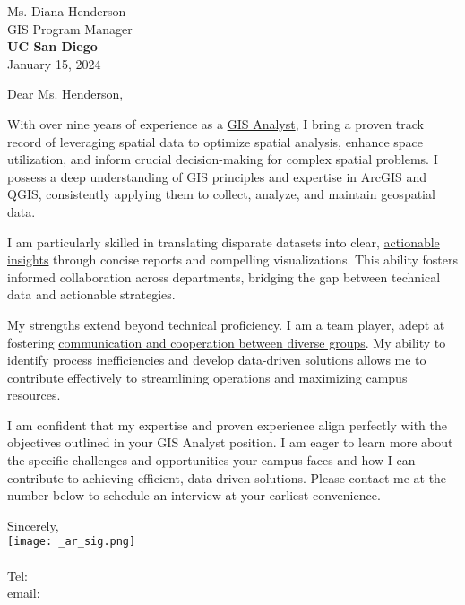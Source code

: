 \documentclass[letterpaper]{article}
\newcommand{\impt}[1]{\uline{#1}}
\newcommand{\CVcompany}{UC San Diego}
\begin{document}
\large
Ms. Diana Henderson \\
GIS Program Manager \\
\textbf{\CVcompany} \\

\null\hfill January 15, 2024


Dear Ms. Henderson,

With over nine years of experience as a \impt{GIS Analyst}, 
I bring a proven track record of leveraging spatial data to optimize spatial analysis, 
enhance space utilization, and inform crucial decision-making for complex spatial problems. 
I possess a deep understanding of GIS principles and expertise in ArcGIS and QGIS, 
consistently applying them to collect, analyze, and maintain geospatial data.

I am particularly skilled in translating disparate datasets into clear, 
\impt{actionable insights} through concise reports and compelling visualizations. 
This ability fosters informed collaboration across departments, 
bridging the gap between technical data and actionable strategies.

My strengths extend beyond technical proficiency. 
I am a team player, adept at fostering \impt{communication and cooperation between diverse groups}. 
My ability to identify process inefficiencies and develop data-driven solutions allows me to 
contribute effectively to streamlining operations and maximizing campus resources.

I am confident that my expertise and proven experience align perfectly with the objectives 
outlined in your GIS Analyst position. 
I am eager to learn more about the specific challenges and opportunities your campus faces and how 
I can contribute to achieving efficient, data-driven solutions.
Please contact me at the number below to schedule an interview at your earliest convenience.


Sincerely,\\
    \hspace{1em}
    \texttt{[image: \_ar\_sig.png]} \\
    \CVsigname \\
    \small
    Tel: \CVphone \\
    email: \CVemail
\end{document}
